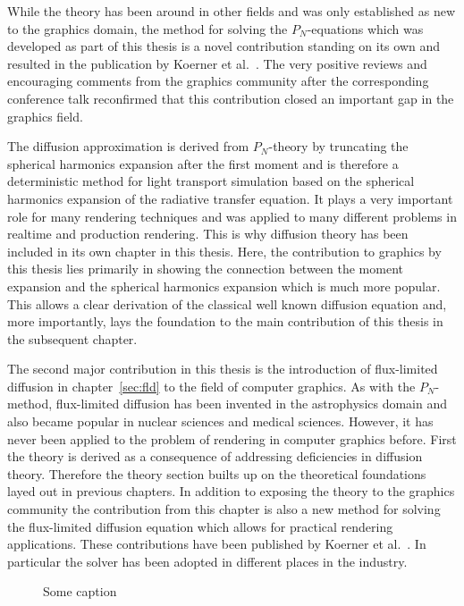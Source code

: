 While the theory has been around in other fields and was only established as new to the graphics domain, the method for solving the $P_N$-equations which was developed as part of this thesis is a novel contribution standing on its own and resulted in the publication by Koerner et al.~\cite{Koerner18}. The very positive reviews and encouraging comments from the graphics community after the corresponding conference talk reconfirmed that this contribution closed an important gap in the graphics field.

The diffusion approximation is derived from $P_N$-theory by truncating the spherical harmonics expansion after the first moment and is therefore a deterministic method for light transport simulation based on the spherical harmonics expansion of the radiative transfer equation. It plays a very important role for many rendering techniques and was applied to many different problems in realtime and production rendering. This is why diffusion theory has been included in its own chapter in this thesis. Here, the contribution to graphics by this thesis lies primarily in showing the connection between the moment expansion and the spherical harmonics expansion which is much more popular. This allows a clear derivation of the classical well known diffusion equation and, more importantly, lays the foundation to the main contribution of this thesis in the subsequent chapter.

The second major contribution in this thesis is the introduction of flux-limited diffusion in chapter~\ref{sec:fld} to the field of computer graphics. As with the $P_N$-method, flux-limited diffusion has been invented in the astrophysics domain and also became popular in nuclear sciences and medical sciences.  However, it has never been applied to the problem of rendering in computer graphics before. First the theory is derived as a consequence of addressing deficiencies in diffusion theory. Therefore the theory section builts up on the theoretical foundations layed out in previous chapters. In addition to exposing the theory to the graphics community the contribution from this chapter is also a new method for solving the flux-limited diffusion equation which allows for practical rendering applications. These contributions have been published by Koerner et al.~\cite{Koerner14}. In particular the solver has been adopted in different places in the industry.
\begin{figure}[h]
\centering
{}
\caption{Some caption}
\label{fig:fld_conclusion_elementacular_1}
\end{figure}

